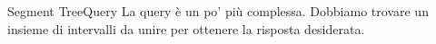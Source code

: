 \documentclass[compress]{beamer}
\begin{document}
\begin{frame}
\end{frame}

\begin{frame}
\end{frame}

\begin{frame}{Segment Tree}{Query}
    La query è un po' più complessa. Dobbiamo trovare un insieme di intervalli da unire per ottenere la risposta desiderata.\\\vfill
\end{frame}
\end{document}

